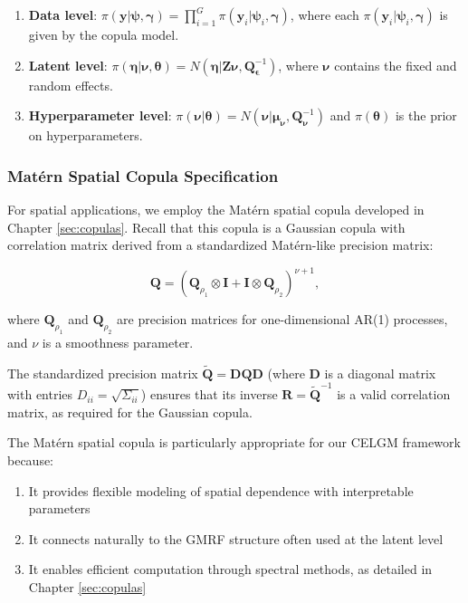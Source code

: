 \begin{enumerate}
    \item \textbf{Data level}: $\pi(\mathbf{y}|\boldsymbol{\psi}, \boldsymbol{\gamma}) = \prod_{i=1}^G \pi(\mathbf{y}_i|\boldsymbol{\psi}_i, \boldsymbol{\gamma})$, where each $\pi(\mathbf{y}_i|\boldsymbol{\psi}_i, \boldsymbol{\gamma})$ is given by the copula model.
    
    \item \textbf{Latent level}: $\pi(\boldsymbol{\eta}|\boldsymbol{\nu}, \boldsymbol{\theta}) = N(\boldsymbol{\eta}|\mathbf{Z}\boldsymbol{\nu}, \mathbf{Q}_{\boldsymbol{\epsilon}}^{-1})$, where $\boldsymbol{\nu}$ contains the fixed and random effects.
    
    \item \textbf{Hyperparameter level}: $\pi(\boldsymbol{\nu}|\boldsymbol{\theta}) = N(\boldsymbol{\nu}|\boldsymbol{\mu}_{\boldsymbol{\nu}}, \mathbf{Q}_{\boldsymbol{\nu}}^{-1})$ and $\pi(\boldsymbol{\theta})$ is the prior on hyperparameters.
\end{enumerate}

\subsubsection{Matérn Spatial Copula Specification}
For spatial applications, we employ the Matérn spatial copula developed in Chapter \ref{sec:copulas}. Recall that this copula is a Gaussian copula with correlation matrix derived from a standardized Matérn-like precision matrix:

\begin{equation}
    \mathbf{Q} = (\mathbf{Q}_{\rho_1} \otimes \mathbf{I} + \mathbf{I} \otimes \mathbf{Q}_{\rho_2})^{\nu+1},
\end{equation}

where $\mathbf{Q}_{\rho_1}$ and $\mathbf{Q}_{\rho_2}$ are precision matrices for one-dimensional AR(1) processes, and $\nu$ is a smoothness parameter.

The standardized precision matrix $\tilde{\mathbf{Q}} = \mathbf{D}\mathbf{Q}\mathbf{D}$ (where $\mathbf{D}$ is a diagonal matrix with entries $D_{ii} = \sqrt{\Sigma_{ii}}$) ensures that its inverse $\mathbf{R} = \tilde{\mathbf{Q}}^{-1}$ is a valid correlation matrix, as required for the Gaussian copula.

The Matérn spatial copula is particularly appropriate for our CELGM framework because:
\begin{enumerate}
    \item It provides flexible modeling of spatial dependence with interpretable parameters
    \item It connects naturally to the GMRF structure often used at the latent level
    \item It enables efficient computation through spectral methods, as detailed in Chapter \ref{sec:copulas}
\end{enumerate}

